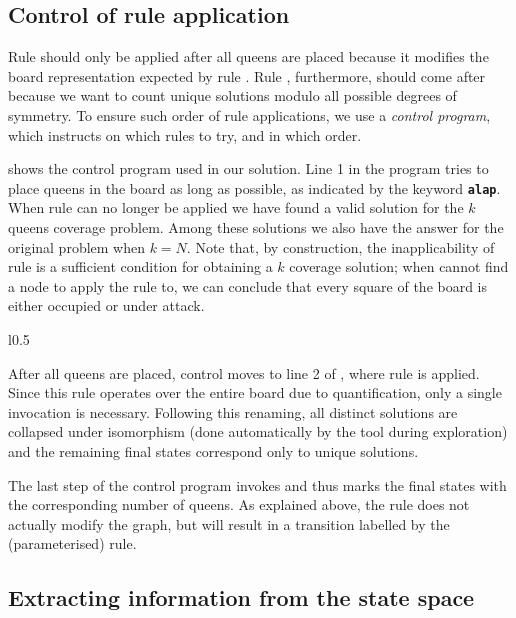 \subsection{Control of rule application}

Rule  should only be applied after all queens are placed because
it modifies the board representation expected by rule . Rule
, furthermore, should come after  because we want
to count unique solutions modulo all possible degrees of symmetry. To ensure
such order of rule applications, we use a \emph{control program}, which
instructs \GROOVE on which rules to try, and in which order.

 shows the control program used in our solution. Line 1 in the
program tries to place queens in the board as long as possible, as indicated
by the keyword \texttt{\textbf{alap}}. When rule  can no longer
be applied we have found a valid solution for the $k$ queens coverage problem.
Among these solutions we also have the answer for the original problem when $k
= N$. Note that, by construction, the inapplicability of rule 
is a sufficient condition for obtaining a $k$ coverage solution; when \GROOVE
cannot find a node to apply the rule to, we can conclude that every square of
the board is either occupied or under attack.

\begin{wrapfigure}[5]{l}{0.5\linewidth}\vspace{-5mm}

\end{wrapfigure}

After all queens are placed, control moves to line 2 of , where
rule  is applied. Since this rule operates over the entire board
due to quantification, only a single invocation is necessary. Following this
renaming, all distinct solutions are collapsed under isomorphism (done
automatically by the tool during exploration) and the remaining final states
correspond only to unique solutions.

The last step of the control program invokes  and thus marks the
final states with the corresponding number of queens. As explained above, the
rule does not actually modify the graph, but will result in a transition
labelled by the (parameterised) rule.

\subsection{Extracting information from the state space}

